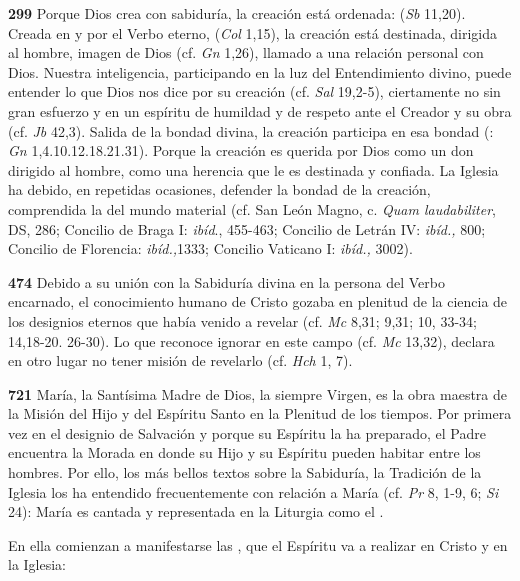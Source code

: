 \textbf{299} Porque Dios crea con sabiduría, la creación está ordenada:  (\emph{Sb} 11,20). Creada en y por el Verbo eterno,  (\emph{Col} 1,15), la creación está destinada, dirigida al hombre, imagen de Dios (cf. \emph{Gn} 1,26), llamado a una relación personal con Dios. Nuestra inteligencia, participando en la luz del Entendimiento divino, puede entender lo que Dios nos dice por su creación (cf. \emph{Sal} 19,2-5), ciertamente no sin gran esfuerzo y en un espíritu de humildad y de respeto ante el Creador y su obra (cf. \emph{Jb} 42,3). Salida de la bondad divina, la creación participa en esa bondad (: \emph{Gn} 1,4.10.12.18.21.31). Porque la creación es querida por Dios como un don dirigido al hombre, como una herencia que le es destinada y confiada. La Iglesia ha debido, en repetidas ocasiones, defender la bondad de la creación, comprendida la del mundo material (cf. San León Magno, c. \emph{Quam laudabiliter}, DS, 286; Concilio de Braga I: \emph{ibíd}., 455-463; Concilio de Letrán IV: \emph{ibíd.,} 800; Concilio de Florencia: \emph{ibíd.,}1333; Concilio Vaticano I: \emph{ibíd.,} 3002).

\textbf{474} Debido a su unión con la Sabiduría divina en la persona del Verbo encarnado, el conocimiento humano de Cristo gozaba en plenitud de la ciencia de los designios eternos que había venido a revelar (cf. \emph{Mc} 8,31; 9,31; 10, 33-34; 14,18-20. 26-30). Lo que reconoce ignorar en este campo (cf. \emph{Mc} 13,32), declara en otro lugar no tener misión de revelarlo (cf. \emph{Hch} 1, 7).

\textbf{}

\textbf{721} María, la Santísima Madre de Dios, la siempre Virgen, es la obra maestra de la Misión del Hijo y del Espíritu Santo en la Plenitud de los tiempos. Por primera vez en el designio de Salvación y porque su Espíritu la ha preparado, el Padre encuentra la Morada en donde su Hijo y su Espíritu pueden habitar entre los hombres. Por ello, los más bellos textos sobre la Sabiduría, la Tradición de la Iglesia los ha entendido frecuentemente con relación a María (cf. \emph{Pr} 8, 1-9, 6; \emph{Si} 24): María es cantada y representada en la Liturgia como el .

En ella comienzan a manifestarse las , que el Espíritu va a realizar en Cristo y en la Iglesia:

